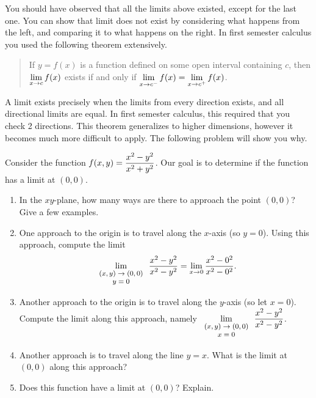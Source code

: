 You should have observed that all the limits above existed, except for the last one.  You can show that limit does not exist by considering what happens from the left, and comparing it to what happens on the right.  In first semester calculus you used the following theorem extensively. 
\begin{quote}
 If $y=f(x)$ is a function defined on some open interval containing $c$, then $\displaystyle\lim_{x\to c}f(x)$ exists if and only if  $\displaystyle\lim_{x\to c^-}f(x) = \displaystyle\lim_{x\to c^+}f(x)$.
\end{quote}
 A limit exists precisely when the limits from every direction exists, and all directional limits are equal. In first semester calculus, this required that you check 2 directions. This theorem generalizes to higher dimensions, however it becomes much more difficult to apply. The following problem will show you why.
\begin{problem}
 Consider the function $\displaystyle f(x,y)=\frac{x^2-y^2}{x^2+y^2}$.
Our goal is to determine if the function has a limit at $(0,0)$.
\begin{enumerate}
 \item In the $xy$-plane, how many ways are there to approach the point $(0,0)$? Give a few examples.
 \item One approach to the origin is to travel along the $x$-axis (so $y=0$). Using this approach, compute the limit 
$$\displaystyle\lim_{\text{\footnotesize $\begin{array}{c}(x,y)\to(0,0)\\ y=0\end{array}$}}\frac{x^2-y^2}{x^2-y^2} = \lim_{x\to 0} \frac{x^2-0^2}{x^2-0^2}.$$
 \item Another approach to the origin is to travel along the $y$-axis (so let $x=0$). Compute the limit along this approach, namely 
$\displaystyle\lim_{\text{\footnotesize $\begin{array}{c}(x,y)\to(0,0)\\ x=0\end{array}$}}\frac{x^2-y^2}{x^2-y^2}$.
 \item Another approach is to travel along the line $y=x$.  What is the limit at $(0,0)$ along this approach?
 \item Does this function have a limit at $(0,0)$? Explain. %
\end{enumerate}
\end{problem}

